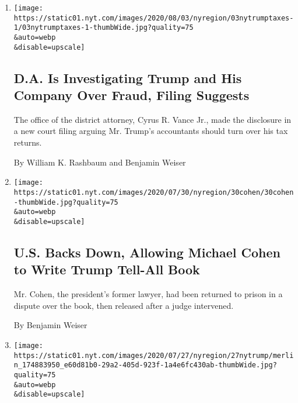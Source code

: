 \begin{enumerate}
\def\labelenumi{\arabic{enumi}.}
\item
  \href{/2020/08/03/nyregion/donald-trump-taxes-cyrus-vance.html}{}

  \texttt{[image: https://static01.nyt.com/images/2020/08/03/nyregion/03nytrumptaxes-1/03nytrumptaxes-1-thumbWide.jpg?quality=75\\\&auto=webp\\\&disable=upscale]}

  \hypertarget{da-is-investigating-trump-and-his-company-over-fraud-filing-suggests}{%
  \subsection{D.A. Is Investigating Trump and His Company Over Fraud,
  Filing
  Suggests}\label{da-is-investigating-trump-and-his-company-over-fraud-filing-suggests}}

  The office of the district attorney, Cyrus R. Vance Jr., made the
  disclosure in a new court filing arguing Mr. Trump's accountants
  should turn over his tax returns.

  By William K. Rashbaum and Benjamin Weiser
\item
  \href{/2020/07/30/nyregion/michael-cohen-donald-trump-book.html}{}

  \texttt{[image: https://static01.nyt.com/images/2020/07/30/nyregion/30cohen/30cohen-thumbWide.jpg?quality=75\\\&auto=webp\\\&disable=upscale]}

  \hypertarget{us-backs-down-allowing-michael-cohen-to-write-trump-tell-all-book}{%
  \subsection{U.S. Backs Down, Allowing Michael Cohen to Write Trump
  Tell-All
  Book}\label{us-backs-down-allowing-michael-cohen-to-write-trump-tell-all-book}}

  Mr. Cohen, the president's former lawyer, had been returned to prison
  in a dispute over the book, then released after a judge intervened.

  By Benjamin Weiser
\item
  \href{/2020/07/27/nyregion/donald-trump-taxes-cyrus-vance.html}{}

  \texttt{[image: https://static01.nyt.com/images/2020/07/27/nyregion/27nytrump/merlin\_174883950\_e60d81b0-29a2-405d-923f-1a4e6fc430ab-thumbWide.jpg?quality=75\\\&auto=webp\\\&disable=upscale]}

  \hypertarget{trump-again-tries-to-block-subpoena-for-taxes-calling-it-wildly-overbroad}{%
}
\end{enumerate}
